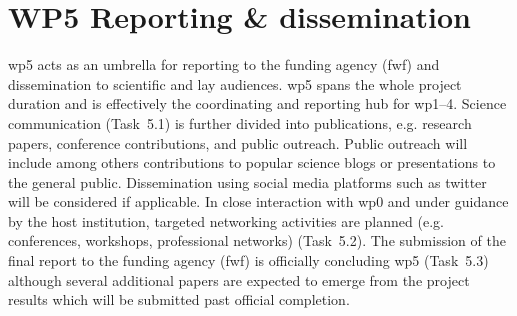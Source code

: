 \section{WP5 Reporting \& dissemination}
\label{sec:wp5}
\gls{wp}5 acts as an umbrella for reporting to the funding agency (\gls{fwf}) and dissemination to scientific and lay audiences. \gls{wp}5 spans the whole project duration and is effectively the coordinating and reporting hub for \gls{wp}1--4. Science communication (Task~5.1) is further divided into publications, e.g. research papers, conference contributions, and public outreach. Public outreach will include among others contributions to popular science blogs or presentations to the general public. Dissemination using social media platforms such as twitter will be considered if applicable. In close interaction with \gls{wp}0 and under guidance by the host institution, targeted networking activities are planned (e.g. conferences, workshops, professional networks) (Task~5.2). The submission of the final report to the funding agency (\gls{fwf}) is officially concluding \gls{wp}5 (Task~5.3) although several additional papers are expected to emerge from the project results which will be submitted past official completion.
